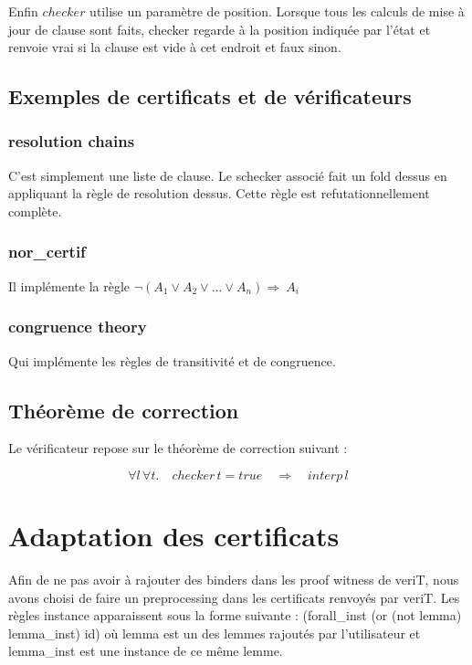 \documentclass{article}
\begin{document}
Enfin $checker$ utilise un paramètre de position. Lorsque tous les calculs de mise à jour de clause sont faits, checker regarde à la position indiquée par l'état et renvoie vrai si la clause est vide à cet endroit et faux sinon.

\subsection{Exemples de certificats et de vérificateurs}
\subsubsection{resolution chains}
C'est simplement une liste de clause.
Le schecker associé fait un fold dessus en appliquant la règle de resolution dessus. Cette règle est refutationnellement complète.

\subsubsection{nor\_certif}
Il implémente la règle $\neg (A_1 \vee A_2 \vee ... \vee A_n) \Rightarrow ~A_i$

\subsubsection{congruence theory}
Qui implémente les règles de transitivité et de congruence.

\subsection{Théorème de correction}

Le vérificateur repose sur le théorème de correction suivant :

\[ \forall l \, \forall t. \quad checker \, t = true \quad \Rightarrow \quad interp \, l \]








\section{Adaptation des certificats}

Afin de ne pas avoir à rajouter des binders dans les proof witness de veriT, nous avons choisi de faire un
preprocessing dans les certificats renvoyés par veriT.
Les règles instance apparaissent sous la forme suivante :
     (forall\_inst (or (not lemma) lemma\_inst) id)
où lemma est un des lemmes rajoutés par l'utilisateur et lemma\_inst est une instance de ce même lemme.
\end{document}
